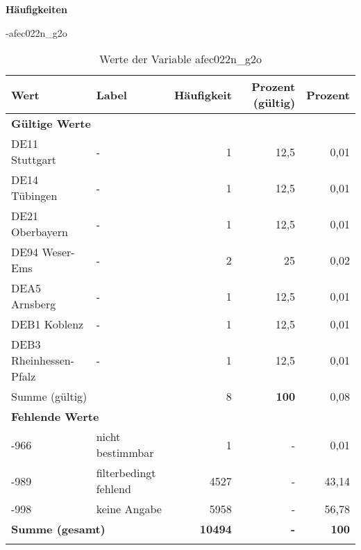         		\vspace*{0.5cm}
                \noindent\textbf{Häufigkeiten}

                \vspace*{-\baselineskip}
					\begin{filecontents}{\jobname-afec022n_g2o}
					\begin{longtable}{Xlrrr}
					\toprule
					\textbf{Wert} & \textbf{Label} & \textbf{Häufigkeit} & \textbf{Prozent (gültig)} & \textbf{Prozent} \\
					\endhead
					\midrule
					\multicolumn{5}{l}{\textbf{Gültige Werte}}\\

					\multicolumn{1}{X}{DE11 Stuttgart} &
					- &
					1 &
					12,5 &
					0,01 \\
					
					\multicolumn{1}{X}{DE14 Tübingen} &
					- &
					1 &
					12,5 &
					0,01 \\
					
					\multicolumn{1}{X}{DE21 Oberbayern} &
					- &
					1 &
					12,5 &
					0,01 \\
					
					\multicolumn{1}{X}{DE94 Weser-Ems} &
					- &
					2 &
					25 &
					0,02 \\
					
					\multicolumn{1}{X}{DEA5 Arnsberg} &
					- &
					1 &
					12,5 &
					0,01 \\
					
					\multicolumn{1}{X}{DEB1 Koblenz} &
					- &
					1 &
					12,5 &
					0,01 \\
					
					\multicolumn{1}{X}{DEB3 Rheinhessen-Pfalz} &
					- &
					1 &
					12,5 &
					0,01 \\
					\midrule
						\multicolumn{2}{l}{Summe (gültig)} & 8 &
						\textbf{100} &
					    0,08 \\
					\multicolumn{5}{l}{\textbf{Fehlende Werte}}\\
							-966 & nicht bestimmbar & 1 & - & 0,01 \\

							-989 & filterbedingt fehlend & 4527 & - & 43,14 \\

							-998 & keine Angabe & 5958 & - & 56,78 \\

					\midrule
					\multicolumn{2}{l}{\textbf{Summe (gesamt)}} & \textbf{10494} & \textbf{-} & \textbf{100} \\
					\bottomrule
					\caption{Werte der Variable afec022n\_g2o}
					\end{longtable}
					\end{filecontents}


